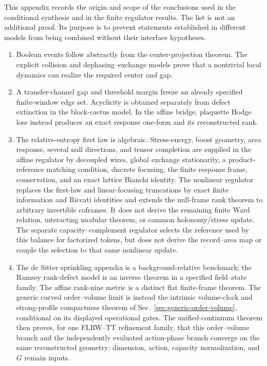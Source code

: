\documentclass[11pt]{article}
\begin{document}
This appendix records the origin and scope of the conclusions used in the
conditional synthesis and in the finite regulator results.  The list is not
an additional proof.  Its purpose is to prevent statements established in
different models from being combined without their interface hypotheses.
\begin{enumerate}[label=(D\arabic*)]
\item Boolean events follow abstractly from the center-projection theorem.
The explicit collision and dephasing--exchange models prove that a nontrivial
local dynamics can realize the required center and gap.
\item A transfer-channel gap and threshold margin freeze an already specified
finite-window edge set.  Acyclicity is obtained separately from defect
extinction in the block-cactus model.  In the affine bridge, plaquette Hodge
loss instead produces an exact response one-form and its reconstructed rank.
\item The relative-entropy first law is algebraic.  Stress-energy, boost
geometry, area response, several null directions, and tensor completion are
supplied in the affine regulator by decoupled wires, global exchange
stationarity, a product-reference matching condition, discrete focusing, the
finite response frame, conservation, and an exact lattice Bianchi identity.
The nonlinear regulator replaces the first-law and linear-focusing
truncations by exact finite information and Riccati identities and extends
the null-frame rank theorem to arbitrary invertible coframes.  It does not
derive the remaining finite Ward relation, interacting modular theorem, or
common holonomy/stress update.  The separate capacity--complement regulator
selects the reference used by this balance for factorized tokens, but does
not derive the record--area map or couple the selection to that same
nonlinear update.
\item The de Sitter sprinkling appendix is a background-relative benchmark;
the Ramsey rank-defect model is an inverse theorem in a specified
field--state family.  The affine rank-nine metric is a distinct flat
finite-frame theorem.  The generic curved order--volume limit is instead the
intrinsic volume-clock and strong-profile compactness theorem of
Sec.~\ref{sec:generic-order-volume}, conditional on its displayed operational
gates.  The unified-continuum theorem then proves, for one FLRW--TT
refinement family, that this order--volume branch and the independently
evaluated action-phase branch converge on the same reconstructed geometry;
dimension, action, capacity normalization, and \(G\) remain inputs.

\end{enumerate}
\end{document}
